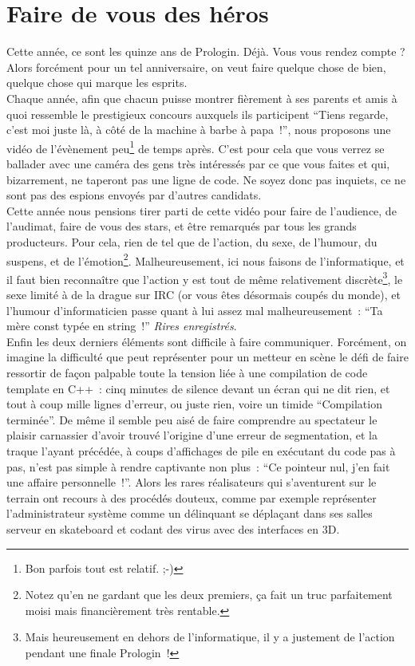 \section{Faire de vous des héros}

Cette année, ce sont les quinze ans de Prologin. Déjà. Vous vous
rendez compte ? Alors forcément pour un tel anniversaire, on veut
faire quelque chose de bien, quelque chose qui marque les esprits.\\

Chaque année, afin que chacun puisse montrer fièrement à ses parents
et amis à quoi ressemble le prestigieux concours auxquels ils
participent ``Tiens regarde, c'est moi juste là, à côté de la machine
à barbe à papa~!'', nous proposons une vidéo de l'évènement
peu\footnote{Bon parfois tout est relatif. ;-)} de temps après. C'est
pour cela que vous verrez se ballader avec une caméra des gens très
intéressés par ce que vous faites et qui, bizarrement, ne taperont pas
une ligne de code. Ne soyez donc pas inquiets, ce ne sont pas des
espions envoyés par d'autres candidats.\\

Cette année nous pensions tirer parti de cette vidéo pour faire de
l'audience, de l'audimat, faire de vous des stars, et être remarqués
par tous les grands producteurs. Pour cela, rien de tel que de
l'action, du sexe, de l'humour, du suspens, et de
l'émotion\footnote{Notez qu'en ne gardant que les deux premiers, ça
fait un truc parfaitement moisi mais financièrement très
rentable.}. Malheureusement, ici nous faisons de l'informatique, et il
faut bien reconnaître que l'action y est tout de même relativement
discrète\footnote{Mais heureusement en dehors de l'informatique, il y
a justement de l'action pendant une finale Prologin~!}, le sexe limité
à de la drague sur IRC (or vous êtes désormais coupés du monde), et
l'humour d'informaticien passe quant à lui assez mal malheureusement~:
``Ta mère const typée en string~!'' \textsl{Rires enregistrés}.\\

Enfin les deux derniers éléments sont difficile à faire communiquer.
Forcément, on imagine la difficulté que peut représenter pour un
metteur en scène le défi de faire ressortir de façon palpable toute la
tension liée à une compilation de code template en C++~: cinq minutes
de silence devant un écran qui ne dit rien, et tout à coup mille
lignes d'erreur, ou juste rien, voire un timide ``Compilation
terminée''. De même il semble peu aisé de faire comprendre au
spectateur le plaisir carnassier d'avoir trouvé l'origine d'une erreur
de segmentation, et la traque l'ayant précédée, à coups d'affichages
de pile en exécutant du code pas à pas, n'est pas simple à rendre
captivante non plus~: ``Ce pointeur nul, j'en fait une affaire
personnelle~!''. Alors les rares réalisateurs qui s'aventurent sur le
terrain ont recours à des procédés douteux, comme par exemple
représenter l'administrateur système comme un délinquant se déplaçant
dans ses salles serveur en skateboard et codant des virus avec des
interfaces en 3D.\\

